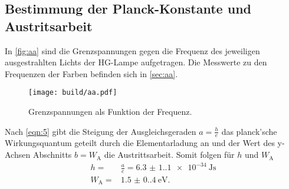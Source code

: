 \subsection{Bestimmung der Planck-Konstante und Austritsarbeit}
\label{sec:planckWa}
\noindent In \autoref{fig:aa} sind die Grenzspannungen gegen die 
Frequenz des jeweiligen ausgestrahlten Lichts der HG-Lampe aufgetragen. Die
Messwerte zu den Frequenzen der Farben befinden sich in \autoref{sec:aa}. 
\begin{figure}[H]
    \centering
    \caption{Grenzspannungen als Funktion der Frequenz.}
    \label{fig:aa}
    \texttt{[image: build/aa.pdf]}
\end{figure} 
\noindent Nach \autoref{eqn:5} gibt die Steigung der Ausgleichsgeraden 
$a = \frac{h}{e}$ das planck'sche Wirkungsquantum geteilt durch die 
Elementarladung an und der Wert des y-Achsen Abschnitts $b =  W_\text{A}$
die Austrittsarbeit. Somit folgen für $h$ und $W_\text{A}$
\begin{align}
    h =& \frac{a}{e} = \qty{6.3(1.1)e-34}{\joule\second}\\
    W_\text{A} =& \qty{1.5(0.4)}{\eV}.
\end{align}